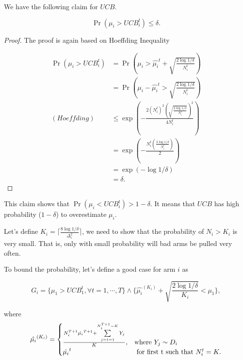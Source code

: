 \documentclass[../main.tex]{subfiles}
\begin{document}
	We have the following claim for $UCB$.
	
	\begin{claim}\label{UCB_claim_1}
		\begin{equation}
			\Pr(\mu_i > UCB_i^t) \leq \delta.
		\end{equation}
	\end{claim}

	\begin{proof}
		The proof is again based on Hoeffding Inequality
		
		\begin{equation*}
			\begin{aligned}
					\Pr(\mu_i > UCB_i^t) & = \Pr(\mu_i >\hat{\mu_i}^t + \sqrt{\frac{2\log 1 /\delta}{N_i^t}}) \\
										 & = \Pr(\mu_i - \hat{\mu_i}^t > \sqrt{\frac{2\log 1 /\delta}{N_i^t}}) \\
									(Hoeffding)&  \leq \exp(-\frac{2(N_i^t)^2 (\sqrt{\frac{2\log 1 /\delta}{N_i^t}})^2 }{4N_i^t } )\\
									& = \exp(-\frac{N_i^t (\frac{2\log 1 /\delta}{N_i^t}) }{2 }) \\
									& = \exp(-\log 1 /\delta )\\
									& = \delta.
			\end{aligned}
		\end{equation*}
	\end{proof}

	This claim shows that $	\Pr(\mu_i < UCB_i^t) > 1- \delta$. It means that $UCB$ has high probability ($1-\delta$) to overestimate $\mu_i$.
	
	Let's define $K_i = \lceil \frac{8 \log 1 / \delta}{\Delta_i^2} \rceil$, we need to show that the probability of $N_i > K_i$ is very small. That is, only with small probability will bad arms be pulled very often.
	
	To bound the probability, let's define a good case for arm $i$ as
	
	\begin{equation*}
		G_i = \{ \mu_1 > UCB_1^t, \forall t = 1,\cdots, T\} \wedge \{\hat{\mu_i}^{(K_i)} + \sqrt{\frac{2\log 1/ \delta}{K_i}} < \mu_1 \},
	\end{equation*}
	
	where
	\begin{equation*}
	\hat{\mu_i}^{(K_i)} = 
	\begin{cases}
	\frac{N_i^{T+1} \hat{\mu_i}^{T+1} + \sum\limits_{j=1=1}^{N_i^{T+1} - K} Y_j}{K}, & \textmd{where } Y_j \sim D_i \\
	\hat{\mu_i}^t &\textmd{ for first t such that } N_i^t = K.
	\end{cases}
	\end{equation*}
	
\end{document}

